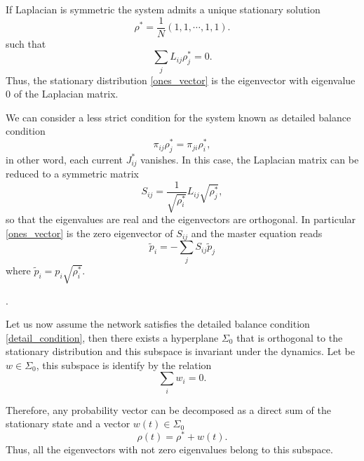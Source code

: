 If Laplacian is symmetric the system admits a unique stationary solution \cite{Classic_random_walk} 
\begin{equation}\label{ones_vector}
    \rho^* = \frac{1}{N} \left(1,1,\cdots,1,1\right).
\end{equation} 
such that
\begin{equation}
    \sum_j L_{ij}\rho^*_j =  0.
\end{equation}
Thus, the stationary distribution \eqref{ones_vector} is the eigenvector with eigenvalue $0$ of the Laplacian matrix. 

We can consider a less strict condition for the system known as detailed balance condition
\begin{equation}\label{detail_condition}
    \pi_{ij} \rho_j^* = \pi_{ji} \rho_i^*,
\end{equation}
in other word, each current $J^*_{ij}$ vanishes.
In this case, the Laplacian matrix can be reduced to a symmetric matrix 
\begin{equation}
    S_{ij}=\frac{1}{\sqrt{\rho_i^\ast}}L_{ij}\sqrt{\rho_j^\ast},
\end{equation}
so that the eigenvalues are real and the eigenvectors are orthogonal. In particular \eqref{ones_vector} is the zero eigenvector of $S_{ij}$ and the master equation reads 
\begin{equation}
    \tilde p_i=-\sum_j S_{ij} \tilde p_j
\end{equation}
where $\tilde p_i=p_i\sqrt{\rho_i^\ast}$. 

.

Let us now assume the network satisfies the detailed balance condition \eqref{detail_condition}, then there exists a hyperplane $\Sigma_0$ that is orthogonal to the stationary distribution and this subspace is invariant under the dynamics. Let be $w \in \Sigma_0$, this subspace is identify by the relation
\begin{equation}
    \sum_i w_i = 0.
\end{equation}


Therefore, any probability vector can be decomposed as a direct sum of the stationary state and a vector $w(t) \in \Sigma_0$ 
\begin{equation}
    \rho(t) = \rho^* + w(t).
\end{equation}
Thus, all the eigenvectors with not zero eigenvalues belong to this subspace.


